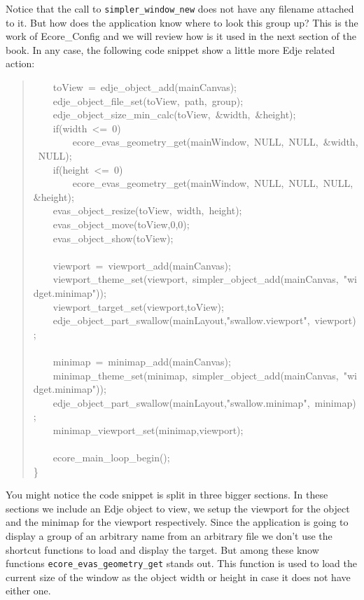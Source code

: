 \documentclass[12pt,a4paper,english]{book}
\begin{document}
Notice that the call to \texttt{simpler{\_}window{\_}new} does not have any filename
attached to it. But how does the application know where to look this group up?
This is the work of Ecore{\_}Config and we will review how is it used in the next
section of the book. In any case, the following code snippet show a little more
Edje related action:
\begin{quote}{\ttfamily \raggedright \noindent
~~~~toView~=~edje{\_}object{\_}add(mainCanvas);~\\
~~~~edje{\_}object{\_}file{\_}set(toView,~path,~group);~\\
~~~~edje{\_}object{\_}size{\_}min{\_}calc(toView,~{\&}width,~{\&}height);~\\
~~~~if(width~<=~0)~\\
~~~~~~~~ecore{\_}evas{\_}geometry{\_}get(mainWindow,~NULL,~NULL,~{\&}width,~NULL);~\\
~~~~if(height~<=~0)~\\
~~~~~~~~ecore{\_}evas{\_}geometry{\_}get(mainWindow,~NULL,~NULL,~NULL,~{\&}height);~\\
~~~~evas{\_}object{\_}resize(toView,~width,~height);~\\
~~~~evas{\_}object{\_}move(toView,0,0);~\\
~~~~evas{\_}object{\_}show(toView);~\\
~\\
~~~~viewport~=~viewport{\_}add(mainCanvas);~\\
~~~~viewport{\_}theme{\_}set(viewport,~simpler{\_}object{\_}add(mainCanvas,~"widget.minimap"));~\\
~~~~viewport{\_}target{\_}set(viewport,toView);~\\
~~~~edje{\_}object{\_}part{\_}swallow(mainLayout,"swallow.viewport",~viewport);~\\
~\\
~~~~minimap~=~minimap{\_}add(mainCanvas);~\\
~~~~minimap{\_}theme{\_}set(minimap,~simpler{\_}object{\_}add(mainCanvas,~"widget.minimap"));~\\
~~~~edje{\_}object{\_}part{\_}swallow(mainLayout,"swallow.minimap",~minimap);~\\
~~~~minimap{\_}viewport{\_}set(minimap,viewport);~\\
~\\
~~~~ecore{\_}main{\_}loop{\_}begin();~\\
{\}}
}\end{quote}

You might notice the code snippet is split in three bigger sections. In
these sections we include an Edje object to view, we setup the viewport for the
object and the minimap for the viewport respectively. Since the application is
going to display a
group of an arbitrary name from an arbitrary file we don't use the shortcut
functions to load and display the target. But among these know functions
\texttt{ecore{\_}evas{\_}geometry{\_}get} stands out. This function is used to load the
current size of the window as the object width or height in case it does not
have either one.
\end{document}
